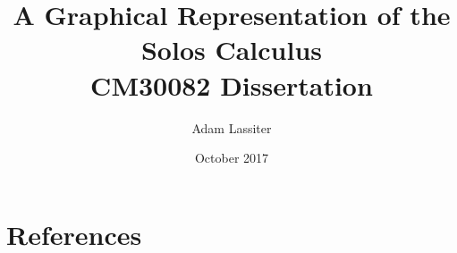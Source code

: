 \documentclass{article}
\title{A Graphical Representation of the Solos Calculus \\
	\large CM30082 Dissertation}
\author{Adam Lassiter}
\date{October 2017}
\begin{document}
\maketitle

\vfill

\tableofcontents

\pagebreak



    



\pagebreak

\section{References}

    



\end{document}
